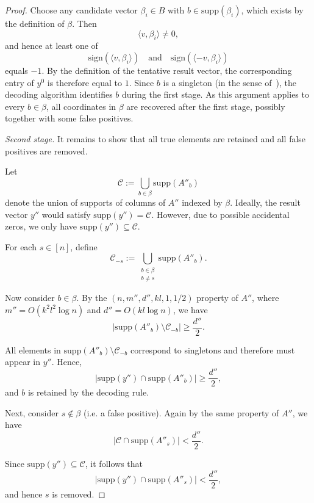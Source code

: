 \documentclass{article}
\newcommand{\supp}{\mathrm{supp}}
\newcommand{\sign}{\mathrm{sign}}
\begin{document}
\begin{proof}
Choose any candidate vector $\beta_i\in B$ with $b\in\supp(\beta_i)$, which exists by the definition of $\beta$. Then
\[
\langle v,\beta_i\rangle\neq0,
\]
and hence at least one of
\[
\sign(\langle v,\beta_i\rangle)
\quad\text{and}\quad
\sign(\langle -v,\beta_i\rangle)
\]
equals $-1$. By the definition of the tentative result vector, the corresponding entry of $y^0$ is therefore equal to $1$. Since $b$ is a singleton (in the sense of~\cite{li2025support}), the decoding algorithm identifies $b$ during the first stage. As this argument applies to every $b\in\beta$, all coordinates in $\beta$ are recovered after the first stage, possibly together with some false positives.

\medskip

\emph{Second stage.}
It remains to show that all true elements are retained and all false positives are removed.

Let
\[
\mathcal{C} := \bigcup_{b \in \beta} \supp(A''_b)
\]
denote the union of supports of columns of $A''$ indexed by $\beta$. Ideally, the result vector $y''$ would satisfy $\supp(y'') = \mathcal{C}$. However, due to possible accidental zeros, we only have $\supp(y'') \subseteq \mathcal{C}$.

For each $s \in [n]$, define
\[
\mathcal{C}_{-s} := \bigcup_{\substack{b \in \beta \\ b \neq s}} \supp(A''_b).
\]

\medskip

Now consider $b \in \beta$. By the $(n,m'',d'',kl,1,1/2)$ property of $A''$, where $m'' = O(k^2 l^2 \log n)$ and $d'' = O(kl \log n)$, we have
\[
|\supp(A''_b) \setminus \mathcal{C}_{-b}| \geq \frac{d''}{2}.
\]

All elements in $\supp(A''_b) \setminus \mathcal{C}_{-b}$ correspond to singletons and therefore must appear in $y''$. Hence,
\[
|\supp(y'') \cap \supp(A''_b)| \geq \frac{d''}{2},
\]
and $b$ is retained by the decoding rule.

\medskip

Next, consider $s \notin \beta$ (i.e. a false positive). Again by the same property of $A''$, we have
\[
|\mathcal{C} \cap \supp(A''_s)| < \frac{d''}{2}.
\]

Since $\supp(y'') \subseteq \mathcal{C}$, it follows that
\[
|\supp(y'') \cap \supp(A''_s)| < \frac{d''}{2},
\]
and hence $s$ is removed.
\end{proof}
\end{document}
